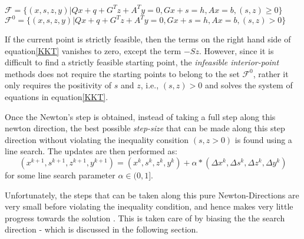\begin{nscenter}
$\mathcal{F} =\{(x,s,z,y)|Q x+q+G^{T} z+A^{T} y=0, G x+s=h, A x=b, (s,z)\geq0\} $
$\mathcal{F}^{0} =\{(x,s,z,y)|Q x+q+G^{T} z+A^{T} y=0, G x+s=h, A x=b, (s,z)>0\} $
\end{nscenter}\par
If the current point is strictly feasible, then the terms on the right hand side of equation\ref{KKT} vanishes to zero, except the term $-Sz$. However, since it is difficult to find a strictly feasible starting point, the \textit{infeasible interior-point} methods does not require the starting points to belong to the set $\mathcal{F}^0$, rather it only requires the positivity of $s$ and $z$, i.e., $(s,z)>0$ and solves the system of equations in equation\ref{KKT}.\par
Once the Newton's step is obtained, instead of taking a full step along this newton direction, the best possible \textit{step-size} that can be made along this step direction without violating the inequality consition $(s,z>0)$ is found using a line search. The updates are then performed as:
\begin{equation}
    (x^{k+1},s^{k+1},z^{k+1},y^{k+1})=(x^{k},s^{k},z^{k},y^{k})+\alpha*(\Delta x^{k},\Delta s^{k},\Delta z^{k},\Delta y^{k})
\end{equation}
\hspace{30pt} for some line search parameter $\alpha \in (0,1] $. \par
Unfortunately, the steps that can be taken along this pure Newton-Directions are very small before violating the inequality condition, and hence makes very little progress towards the solution \cite{wright1997primal}. This is taken care of by biasing the the search direction - which is discussed in the following section.
